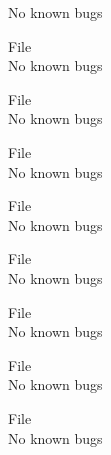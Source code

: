 \begin{DoxyRefList}
\label{bug__bug000031}%
%
No known bugs  
\item[File \doxylink{sign___8cpp}{sign\+\_\+.cpp} ]\hfill \\
\label{bug__bug000066}%
%
No known bugs  
\item[File \doxylink{sign___8h}{sign\+\_\+.h} ]\hfill \\
\label{bug__bug000032}%
%
No known bugs  
\item[File \doxylink{timediff_8cpp}{timediff.cpp} ]\hfill \\
\label{bug__bug000067}%
%
No known bugs  
\item[File \doxylink{timediff_8h}{timediff.h} ]\hfill \\
\label{bug__bug000033}%
%
No known bugs  
\item[File \doxylink{TimeUpdate_8cpp}{Time\+Update.cpp} ]\hfill \\
\label{bug__bug000068}%
%
No known bugs  
\item[File \doxylink{TimeUpdate_8h}{Time\+Update.h} ]\hfill \\
\label{bug__bug000034}%
%
No known bugs  
\item[File \doxylink{VarEqn_8cpp}{Var\+Eqn.cpp} ]\hfill \\
\label{bug__bug000069}%
%
No known bugs  
\item[File \doxylink{VarEqn_8h}{Var\+Eqn.h} ]\hfill \\
\label{bug__bug000035}%
%
No known bugs 
\end{DoxyRefList}